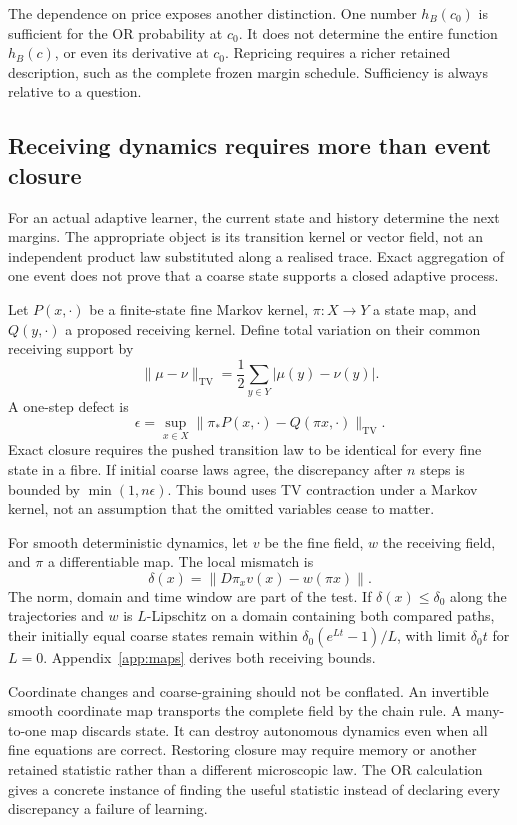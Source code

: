 The dependence on price exposes another distinction. One number \(h_B(c_0)\) is sufficient for the OR probability at \(c_0\). It does not determine the entire function \(h_B(c)\), or even its derivative at \(c_0\). Repricing requires a richer retained description, such as the complete frozen margin schedule. Sufficiency is always relative to a question.

\subsection{Receiving dynamics requires more than event closure}
\label{subsec:receiving-dynamics}

For an actual adaptive learner, the current state and history determine the next margins. The appropriate object is its transition kernel or vector field, not an independent product law substituted along a realised trace. Exact aggregation of one event does not prove that a coarse state supports a closed adaptive process.

Let \(P(x,\cdot)\) be a finite-state fine Markov kernel, \(\pi:X\to Y\) a state map, and \(Q(y,\cdot)\) a proposed receiving kernel. Define total variation on their common receiving support by
\[
 \|\mu-\nu\|_{\mathrm{TV}}
       =\frac12\sum_{y\in Y}|\mu(y)-\nu(y)|.
\]
A one-step defect is
\begin{equation}
 \epsilon=
 \sup_{x\in X}
 \|\pi_*P(x,\cdot)-Q(\pi x,\cdot)\|_{\mathrm{TV}} .
 \label{eq:kernel-defect}
\end{equation}
Exact closure requires the pushed transition law to be identical for every fine state in a fibre. If initial coarse laws agree, the discrepancy after \(n\) steps is bounded by \(\min(1,n\epsilon)\). This bound uses TV contraction under a Markov kernel, not an assumption that the omitted variables cease to matter.

For smooth deterministic dynamics, let \(v\) be the fine field, \(w\) the receiving field, and \(\pi\) a differentiable map. The local mismatch is
\begin{equation}
 \delta(x)=\|D\pi_xv(x)-w(\pi x)\|.
 \label{eq:yba-app-infinitesimal-defect}
\end{equation}
The norm, domain and time window are part of the test. If \(\delta(x)\leq\delta_0\) along the trajectories and \(w\) is \(L\)-Lipschitz on a domain containing both compared paths, their initially equal coarse states remain within
\(\delta_0(e^{Lt}-1)/L\), with limit \(\delta_0t\) for \(L=0\). Appendix~\ref{app:maps} derives both receiving bounds.

Coordinate changes and coarse-graining should not be conflated. An invertible smooth coordinate map transports the complete field by the chain rule. A many-to-one map discards state. It can destroy autonomous dynamics even when all fine equations are correct. Restoring closure may require memory or another retained statistic rather than a different microscopic law. The OR calculation gives a concrete instance of finding the useful statistic instead of declaring every discrepancy a failure of learning.
